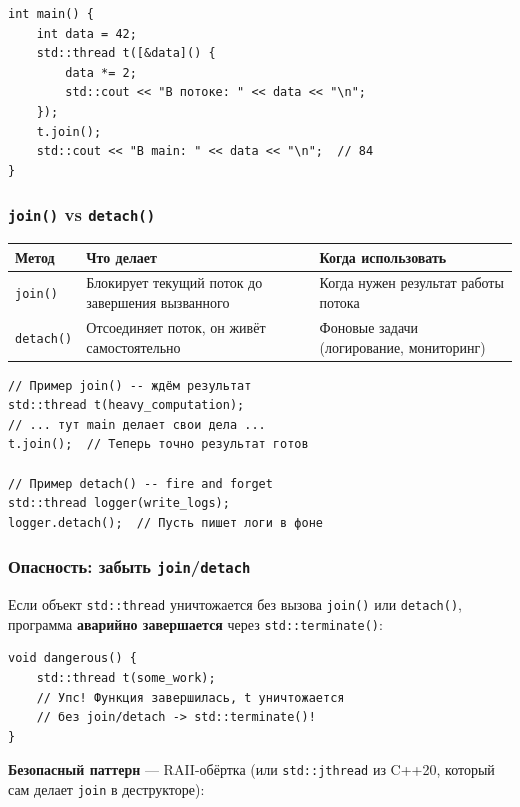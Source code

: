\documentclass[a4paper,12pt]{article}
\begin{document}
\begin{lstlisting}
int main() {
    int data = 42;
    std::thread t([&data]() {
        data *= 2;
        std::cout << "В потоке: " << data << "\n";
    });
    t.join();
    std::cout << "В main: " << data << "\n";  // 84
}
\end{lstlisting}

\subsubsection{\texttt{join()} vs \texttt{detach()}}

\begin{center}
\begin{tabular}{lp{5cm}p{5cm}}
\toprule
\textbf{Метод} & \textbf{Что делает} & \textbf{Когда использовать} \\
\midrule
\texttt{join()}
    & Блокирует текущий поток до завершения вызванного
    & Когда нужен результат работы потока \\
\addlinespace
\texttt{detach()}
    & Отсоединяет поток, он живёт самостоятельно
    & Фоновые задачи (логирование, мониторинг) \\
\bottomrule
\end{tabular}
\end{center}

\begin{lstlisting}
// Пример join() -- ждём результат
std::thread t(heavy_computation);
// ... тут main делает свои дела ...
t.join();  // Теперь точно результат готов

// Пример detach() -- fire and forget
std::thread logger(write_logs);
logger.detach();  // Пусть пишет логи в фоне
\end{lstlisting}

\subsubsection{Опасность: забыть \texttt{join}/\texttt{detach}}

Если объект \texttt{std::thread} уничтожается без вызова \texttt{join()} или
\texttt{detach()}, программа \textbf{аварийно завершается} через
\texttt{std::terminate()}:

\begin{lstlisting}
void dangerous() {
    std::thread t(some_work);
    // Упс! Функция завершилась, t уничтожается
    // без join/detach -> std::terminate()!
}
\end{lstlisting}

\textbf{Безопасный паттерн} --- RAII-обёртка (или \texttt{std::jthread} из C++20,
который сам делает \texttt{join} в деструкторе):
\end{document}

